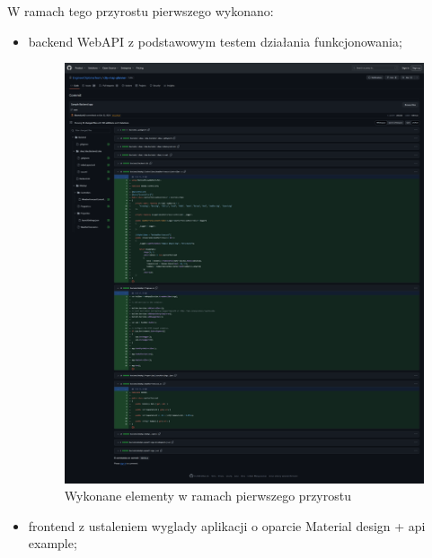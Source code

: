 W ramach tego przyrostu pierwszego wykonano:
\begin{itemize}
    \item backend WebAPI z podstawowym testem działania funkcjonowania;
    \begin{figure}[H]
        \centering
        \includegraphics[width=1\textwidth]{attachments/1}
        \caption{Wykonane elementy w ramach pierwszego przyrostu}
        \label{fig:figure}
        \end{figure}
    \item frontend z ustaleniem wyglady aplikacji o oparcie Material design + api example;
    \begin{figure}[H]
        \centering

\end{figure}
\end{itemize}
